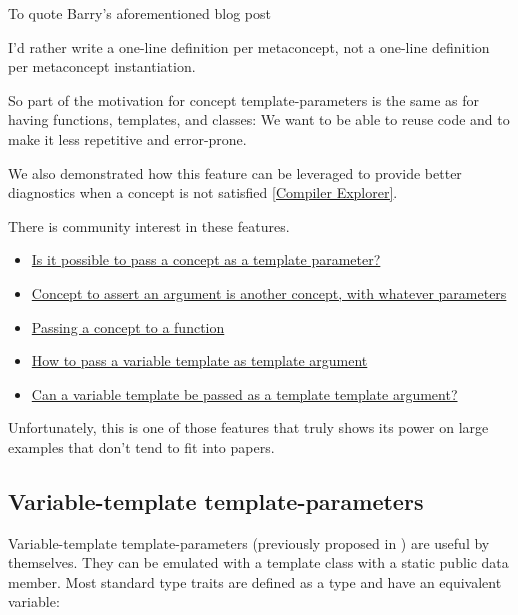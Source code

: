 \documentclass{wg21}
\begin{document}
To quote Barry's aforementioned blog post

\begin{quoteblock}
I’d rather write a one-line definition per metaconcept, not a one-line definition per metaconcept instantiation.
\end{quoteblock}

So part of the motivation for concept template-parameters is the same as for having functions, templates, and classes:
We want to be able to reuse code and to make it less repetitive and error-prone.


We also demonstrated how this feature can be leveraged to provide better diagnostics when a concept is not satisfied \href{https://compiler-explorer.com/z/sPz5faEbP}{[Compiler Explorer]}.


There is community interest in these features.
\begin{itemize}
\item \href{https://stackoverflow.com/questions/63098070/is-it-possible-to-pass-a-concept-as-a-template-parameter}{Is it possible to pass a concept as a template parameter?}
\item \href{https://stackoverflow.com/questions/72488554/concept-to-assert-an-argument-is-another-concept-with-whatever-parameters}{Concept to assert an argument is another concept, with whatever parameters}
\item \href{https://stackoverflow.com/questions/58875829/passing-a-concept-to-a-function}{Passing a concept to a function}
\item \href{https://stackoverflow.com/questions/61664468/how-to-pass-a-variable-template-as-template-argument}{How to pass a variable template as template argument}
\item \href{https://stackoverflow.com/questions/58592312/can-a-variable-template-be-passed-as-a-template-template-argument}{Can a variable template be passed as a template template argument?}
\end{itemize}

Unfortunately, this is one of those features that truly shows its power on large examples that don't tend to fit into papers.

\subsection{Variable-template template-parameters}

Variable-template template-parameters (previously proposed in ) are useful by themselves.
They can be emulated with a template class with a static public  data member.
Most standard type traits are defined as a type and have an equivalent  variable:
\end{document}
